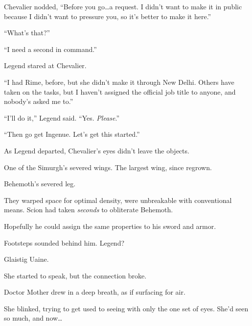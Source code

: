Chevalier nodded, ``Before you go\ldots a request.  I didn't want to make it in public because I didn't want to pressure you, so it's better to make it here.''



``What's that?''



``I need a second in command.''



Legend stared at Chevalier.



``I had Rime, before, but she didn't make it through New Delhi.  Others have taken on the tasks, but I haven't assigned the official job title to anyone, and nobody's asked me to.''



``I'll do it,'' Legend said.  ``Yes.  \emph{Please}.''



``Then go get Ingenue.  Let's get this started.''



As Legend departed, Chevalier's eyes didn't leave the objects.



One of the Simurgh's severed wings.  The largest wing, since regrown.



Behemoth's severed leg.



They warped space for optimal density, were unbreakable with conventional means.  Scion had taken \emph{seconds} to obliterate Behemoth.



Hopefully he could assign the same properties to his sword and armor.



Footsteps sounded behind him.  Legend?



Glaistig Uaine.



She started to speak, but the connection broke.



\sectionbreak



Doctor Mother drew in a deep breath, as if surfacing for air.



She blinked, trying to get used to seeing with only the one set of eyes.  She'd seen so much, and now\ldots



